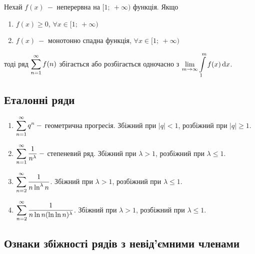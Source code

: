 \begin{theorem}
    Нехай $f(x) \: -$ неперервна на $[1; \: + \infty)$ функція. Якщо
    \begin{enumerate} 
        \item $f(x) \geqslant 0$, $\forall x \in [1; \: + \infty)$%
        
        \item $f(x) \: -$ монотонно спадна функція, $\forall x \in [1; \: + \infty)$
    \end{enumerate}
    
    тоді ряд $\displaystyle\sum\limits_{n=1}^\infty f(n)$ збігається або розбігається одночасно з $\displaystyle\lim\limits_{m \to \infty} \displaystyle\int\limits_1^m f(x) \, \mathrm{d}x$.
\end{theorem}

\subsection{\large{Еталонні ряди}}
 \begin{enumerate}
            \item $\displaystyle\sum\limits_{n=1}^\infty q^{n} \: -$ геометрична прогресія. 
          Збіжний при $|q| < 1 $, розбіжний при  $|q|  \geqslant  1$.
           \item $\displaystyle\sum\limits_{n=1}^\infty \dfrac{1}{n^{\lambda}}  \: - $ степеневий ряд.
           Збіжний при $\lambda >1 $, розбіжний при  $\lambda  \leqslant  1$.
           \item $\displaystyle\sum\limits_{n=2}^\infty \dfrac{1}{n  \ln^{\lambda}{n}}$. Збіжний при $\lambda >1 $, розбіжний при  $\lambda  \leqslant  1$.
           \item $\displaystyle\sum\limits_{n=2}^\infty \dfrac{1}{n  \ln{n}  (\ln{\ln{{n}}})^{\lambda}}$. Збіжний при $\lambda >1 $, розбіжний при  $\lambda  \leqslant  1$.
          
       
       \end{enumerate}

\subsection{\large{Ознаки збіжності рядів з невід'ємними членами}}

